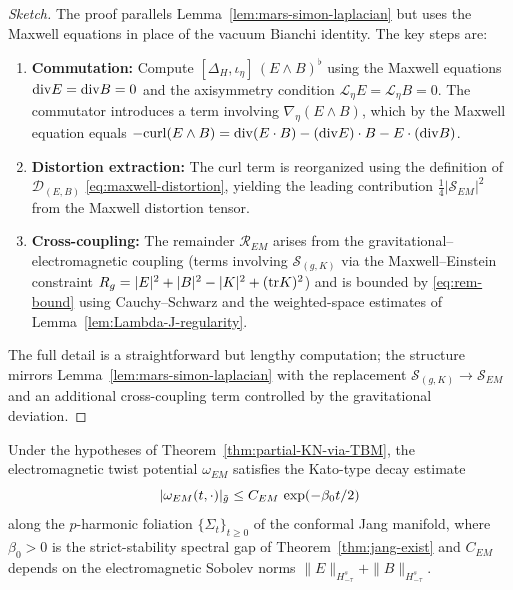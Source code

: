 \begin{proof}[Sketch]
The proof parallels Lemma~\ref{lem:mars-simon-laplacian} but uses the Maxwell equations in place of the vacuum Bianchi identity. The key steps are:
\begin{enumerate}
\item \textbf{Commutation:} Compute $[\Delta_H, \iota_\eta]\,(E\wedge B)^\flat$ using the Maxwell equations $\mathrm{div} E = \mathrm{div} B = 0$ and the axisymmetry condition $\mathcal{L}_\eta E = \mathcal{L}_\eta B = 0$. The commutator introduces a term involving $\nabla_\eta(E\wedge B)$, which by the Maxwell equation equals $-\mathrm{curl}(E\wedge B) = \mathrm{div}(E\cdot B) - (\mathrm{div} E)\cdot B - E\cdot(\mathrm{div} B)$.
\item \textbf{Distortion extraction:} The curl term is reorganized using the definition of $\mathcal{D}_{(E,B)}$ \eqref{eq:maxwell-distortion}, yielding the leading contribution $\tfrac{1}{4}|\mathcal{S}_{EM}|^2$ from the Maxwell distortion tensor.
\item \textbf{Cross-coupling:} The remainder $\mathcal{R}_{EM}$ arises from the gravitational--electromagnetic coupling (terms involving $\mathcal{S}_{(g,K)}$ via the Maxwell--Einstein constraint $R_g = |E|^2 + |B|^2 - |K|^2 + (\mathrm{tr} K)^2$) and is bounded by \eqref{eq:rem-bound} using Cauchy--Schwarz and the weighted-space estimates of Lemma~\ref{lem:Lambda-J-regularity}.
\end{enumerate}
The full detail is a straightforward but lengthy computation; the structure mirrors Lemma~\ref{lem:mars-simon-laplacian} with the replacement $\mathcal{S}_{(g,K)}\to\mathcal{S}_{EM}$ and an additional cross-coupling term controlled by the gravitational deviation.
\end{proof}

\begin{theorem}\label{thm:kato-em}
Under the hypotheses of Theorem~\ref{thm:partial-KN-via-TBM}, the electromagnetic twist potential $\omega_{EM}$ satisfies the Kato-type decay estimate
\begin{equation}\label{eq:kato-em}
|\omega_{EM}(t, \cdot)|_{\tilde{g}} \leq C_{EM}\,\exp(-\beta_0 t/2)
\end{equation}
along the $p$-harmonic foliation $\{\Sigma_t\}_{t\geq 0}$ of the conformal Jang manifold, where $\beta_0 > 0$ is the strict-stability spectral gap of Theorem~\ref{thm:jang-exist} and $C_{EM}$ depends on the electromagnetic Sobolev norms $\|E\|_{H^s_{-\tau}} + \|B\|_{H^s_{-\tau}}$.
\end{theorem}

